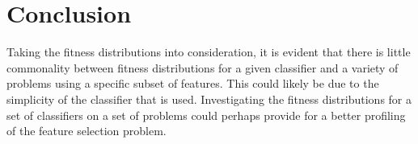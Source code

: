 \documentclass[journal,comsoc]{IEEEtran}
\begin{document}
%



\section{Conclusion}

Taking the fitness distributions into consideration, it is evident that there is little commonality between fitness distributions for a given classifier and a variety of problems using a specific subset of features. This could likely be due to the simplicity of the classifier that is used. Investigating the fitness distributions for a set of classifiers on a set of problems could perhaps provide for a better profiling of the feature selection problem. 
\end{document}
